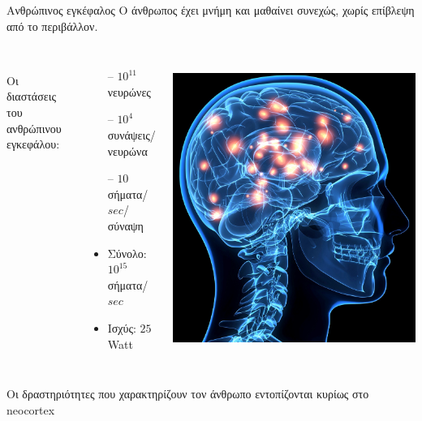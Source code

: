 \documentclass[11pt,center]{beamer}
\begin{document}
\begin{frame}{Ανθρώπινος εγκέφαλος}
  O άνθρωπος έχει \alert{μνήμη} και μαθαίνει \alert{συνεχώς}, χωρίς επίβλεψη από το περιβάλλον.

  \pause
  \begin{columns}
	\\ Οι διαστάσεις του ανθρώπινου εγκεφάλου:
	\small{
	\begin{itemize}
	  \item[--] $10^{11}$ νευρώνες
	  \item[--] $10^4$ συνάψεις/νευρώνα
	  \item[--] $10$ σήματα/$sec$/σύναψη
	  \vspace{+0.5em}
	  \item Σύνολο: $10^{15}$ σήματα/$sec$
	  \item Ισχύς: $25$ Watt
	\end{itemize}
	}
	\\
	\includegraphics[width=1\textwidth]{../pics/brain.jpeg}
  \end{columns}

  \pause
  \begin{block}{}
	Οι δραστηριότητες που χαρακτηρίζουν τον άνθρωπο εντοπίζονται κυρίως στο \alert{neocortex}
  \end{block}
\end {frame}
\end{document}
